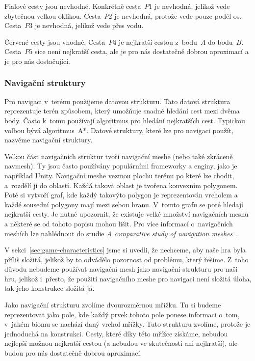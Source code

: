 Fialové cesty jsou nevhodné. Konkrétně cesta~$P1$ je nevhodná, jelikož vede zbytečnou velkou oklikou. Cesta~$P2$ je nevhodná, protože vede pouze podél os. Cesta~$P3$ je nevhodná, jelikož vede přes vodu.

Červené cesty jsou vhodné. Cesta~$P4$ je nejkratší cestou z~bodu~$A$ do bodu~$B$. Cesta~$P5$ sice není nejkratší cesta, ale je pro nás dostatečně dobrou aproximací a je pro nás dostačující.

\newpage

\subsubsection{Navigační struktury}
Pro navigaci v~terénu použijeme datovou strukturu. Tato datová struktura reprezentuje terén způsobem, který umožňuje snadné hledání cest mezi dvěma body. Často k~tomu používají algoritmus pro hledání nejkratších cest. Typickou volbou bývá algoritmus~A*. Datové struktury, které lze pro navigaci použít, nazvěme navigační struktury.

Velkou část navigačních struktur tvoří navigační meshe (nebo také zkráceně navmesh). Ty jsou často používány populárními frameworky a enginy, jako je například Unity. Navigační meshe vezmou plochu terénu po které lze chodit, a~rozdělí ji do oblastí. Každá taková oblast je tvořena konvexním polygonem. Poté si vytvoří graf, kde každý takovýto polygon je reprezentován vrcholem a každé sousední polygony mají mezi sebou hranu. V~tomto grafu se poté hledají nejkratší cesty. Je nutné upozornit, že existuje velké množství navigačních meshů a některé se od tohoto popisu mohou lišit. Pro více informací o~navigačních meshích lze nahlédnout do studie \textit{A comparative study of navigation meshes}~\cite{10.1145/2994258.2994262}.

V sekci~\ref{sec:game-characteristics} jsme si uvedli, že nechceme, aby naše hra byla příliš složitá, jelikož by to odvádělo pozornost od problému, který řešíme. Z~toho důvodu nebudeme používat navigační mesh jako navigační strukturu pro naši hru, jelikož i~přesto, že použití navigačního meshe pro navigaci není složitá úloha, tak jeho konstrukce složitá já.

Jako navigační strukturu zvolíme dvourozměrnou mřížku. Tu si budeme reprezentovat jako pole, kde každý prvek tohoto pole ponese informaci o~tom, v~jakém biomu se nachází daný vrchol mřížky. Tuto strukturu zvolíme, protože je jednoduchá na konstrukci. Cesty, které díky této mřížce získáme, nebudou nejlepší možnou nejkratší cestou (a nebudou ve skutečnosti ani nejkratší), ale budou pro nás dostatečně dobrou aproximací. 

